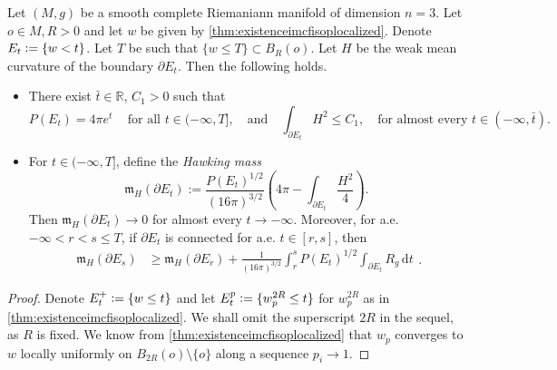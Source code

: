 \documentclass[a4paper,12pt,reqno]{amsart}
\numberwithin{equation}{section}
\theoremstyle{plain}
\theoremstyle{definition}
\theoremstyle{remark}
\newcommand{\eqdef}{\ensuremath{\vcentcolon=}}
\newcommand{\de}{\ensuremath{\,\mathrm d}} %
\begin{document}
{\begin{proposition}\label{prop:PerimetroEHawkingsProperty}
Let $(M,g)$ be a smooth complete Riemaniann manifold of dimension $n=3$. Let $o\in M, R>0$ and let $w$ be given by \cref{thm:existenceimcfisoplocalized}. Denote $E_t\eqdef \{w <t\}$. Let $T$ be such that $\{w \le T\} \subset B_R(o)$. Let $H$ be the weak mean curvature of the boundary $\partial E_t$. Then the following holds.
            \begin{itemize}
                \item There exist $\bar t\in\mathbb R$, $C_1>0$ such that
                \begin{equation}\label{eqn:AsymptoticsPerimeterAndH}
        {P(E_t)=4\pi e^t}\, \quad \text{for all $t\in (-\infty,T]$}, \quad \text{and} \quad \int_{\partial E_t} H^2 \leq C_1, \quad \text{for almost every $t\in (-\infty,\bar t)$}.
        \end{equation}
        \item For $t\in (-\infty,T]$,  define the \emph{Hawking mass}
\begin{equation}\label{eqn:HawkingMass}
\mathfrak{m}_H(\partial E_t):=\frac{P(E_t)^{1/2}}{(16\pi)^{3/2}}\left(4\pi-\int_{\partial E_t}\frac{H^2}{4}\right).
    \end{equation}
    Then $\mathfrak{m}_H(\partial E_t)\to 0$ for almost every $t\to -\infty$. Moreover, {for a.e. $-\infty<r<s\leq T$, if $\partial E_t$ is connected for a.e. $t \in [r,s]$, then
    \begin{equation}\label{eqn:GerochMonotonicity}
        \begin{split}\mathfrak{m}_H(\partial E_s) &\geq \mathfrak{m}_H(\partial E_r)+ 
         \frac{1}{(16\pi)^{3/2}}\int_r^s P(E_t)^{1/2}\int_{\partial E_t}R_g\de t
        \end{split}.
    \end{equation}
    }
 \end{itemize}
 \end{proposition}

        
\begin{proof}
Denote $E_t^+\eqdef \{ w\le t\}$ and let $E^p_t\eqdef \{ w^{2R}_p \le t\}$ for $w^{2R}_p$ as in \cref{thm:existenceimcfisoplocalized}. We shall omit the superscript $2R$ in the sequel, as $R$ is fixed. We know from \cref{thm:existenceimcfisoplocalized} that $w_p$ converges to $w$ locally uniformly on $B_{2R}(o)\setminus\{o\}$ along a sequence $p_i\to1$.


\end{proof}}
\end{document}
